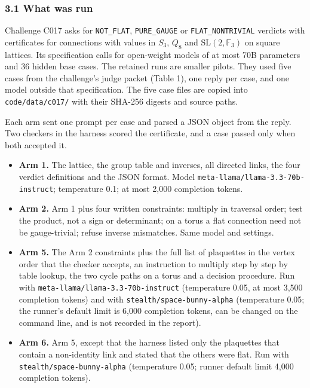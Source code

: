 \documentclass[
  11pt,
]{article}
\providecommand{\tightlist}{%
  \setlength{\itemsep}{0pt}\setlength{\parskip}{0pt}}
\begin{document}
\hypertarget{what-was-run}{%
\subsubsection{3.1 What was run}\label{what-was-run}}

Challenge C017 asks for \texttt{NOT\_\allowbreak{}FLAT},
\texttt{PURE\_\allowbreak{}GAUGE} or
\texttt{FLAT\_\allowbreak{}NONTRIVIAL} verdicts with certificates for
connections with values in \(S_3\), \(Q_8\) and
\(\mathrm{SL}(2, \mathbb{F}_3)\) on square lattices. Its specification
calls for open-weight models of at most 70B parameters and 36 hidden
base cases. The retained runs are smaller pilots. They used five cases
from the challenge's judge packet (Table 1), one reply per case, and one
model outside that specification. The five case files are copied into
\texttt{code/\allowbreak{}data/\allowbreak{}c017/\allowbreak{}} with
their SHA-256 digests and source paths.

Each arm sent one prompt per case and parsed a JSON object from the
reply. Two checkers in the harness scored the certificate, and a case
passed only when both accepted it.

\begin{itemize}
\tightlist
\item
  \textbf{Arm 1.} The lattice, the group table and inverses, all
  directed links, the four verdict definitions and the JSON format.
  Model
  \texttt{meta-\allowbreak{}llama/\allowbreak{}llama-\allowbreak{}3.3-\allowbreak{}70b-\allowbreak{}instruct};
  temperature 0.1; at most 2,000 completion tokens.
\item
  \textbf{Arm 2.} Arm 1 plus four written constraints: multiply in
  traversal order; test the product, not a sign or determinant; on a
  torus a flat connection need not be gauge-trivial; refuse inverse
  mismatches. Same model and settings.
\item
  \textbf{Arm 5.} The Arm 2 constraints plus the full list of plaquettes
  in the vertex order that the checker accepts, an instruction to
  multiply step by step by table lookup, the two cycle paths on a torus
  and a decision procedure. Run with
  \texttt{meta-\allowbreak{}llama/\allowbreak{}llama-\allowbreak{}3.3-\allowbreak{}70b-\allowbreak{}instruct}
  (temperature 0.05, at most 3,500 completion tokens) and with
  \texttt{stealth/\allowbreak{}space-\allowbreak{}bunny-\allowbreak{}alpha}
  (temperature 0.05; the runner's default limit is 6,000 completion
  tokens, can be changed on the command line, and is not recorded in the
  report).
\item
  \textbf{Arm 6.} Arm 5, except that the harness listed only the
  plaquettes that contain a non-identity link and stated that the others
  were flat. Run with
  \texttt{stealth/\allowbreak{}space-\allowbreak{}bunny-\allowbreak{}alpha}
  (temperature 0.05; runner default limit 4,000 completion tokens).
\end{itemize}
\end{document}
